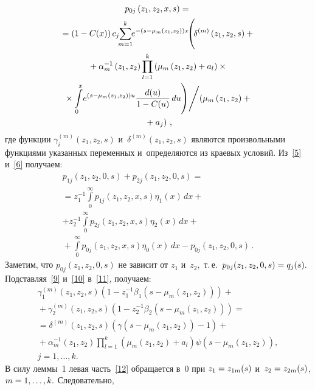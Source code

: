 \begin{multicols}{2}
\noindent
\begin{multline}
\label{10}
p_{0j}\left(z_1,z_2,x,s\right)={}\\
{}=\left(1-C(x)\right)
c_j\!\!\sum\limits_{m=1}^k\!\! e^{-(s-\mu_m(z_1,z_2))x}\!
\!\left(\!
\vphantom{\int\limits_{l=1}^k}
\delta^{(m)}\left(z_1,z_2,s\right)+{}\right.\\
{}+\alpha_m^{-1}\left(z_1,z_2\right)
\prod\limits_{l=1}^k
\left(\mu_m\left(z_1,z_2\right)+a_l\right)\times{}\\
\left.{}\times \int\limits_0^x\!
e^{(s-\mu_m(z_1,z_2))u}
\fr{d(u)}{1-C(u)}\,du
\right)
\!\Bigg/ \!\left(\mu_m\left(z_1,z_2\right)+{}\right.\\
\left.{}+a_j\right)\,,
\end{multline}
где функции $\gamma_i^{(m)}(z_1,z_2,s)$  и~$\delta^{(m)}(z_1,z_2,s)$ являются
произвольными функциями указанных переменных и~определяются из
краевых условий. Из~\eqref{5} и~\eqref{6} получаем:
\begin{multline}
\label{11}
p_{1j}\left(z_1,z_2,0,s\right)+p_{2j}\left(z_1,z_2,0,s\right)={}\\
{}=z_1^{-1}\int\limits_0^{\infty}p_{1j}\left(z_1,z_2,x,s\right)\eta_1(x)\,dx+{}
\\
+z_2^{-1}\int\limits_0^{\infty}p_{2j}\left(z_1,z_2,x,s\right)\eta_2(x)\,dx+{}\\
{}+
\int\limits_0^{\infty}p_{0j}\left(z_1,z_2,x,s\right)\eta_0(x)\,dx
-p_{0j}\left(z_1,z_2,0,s\right)\,.
\end{multline}
Заметим, что $p_{0j}(z_1,z_2,0,s)$ не зависит от $z_1$ и~$z_2,$ т.\,е.\
$p_{0j}(z_1,z_2,0,s)\hm=q_j(s).$ 
Подставляя~\eqref{9} и~\eqref{10} в~\eqref{11}, получаем:
\begin{multline}
\label{12}
\gamma_1^{(m)}\left(z_1,z_2,s\right)\left(1-z_1^{-1}\beta_1(s-\mu_m(z_1,z_2))\right)+{}\\
{}+
\gamma_2^{(m)}(z_1,z_2,s)\left(1-z_2^{-1}\beta_2(s-\mu_m(z_1,z_2))\right)={}\\
{} =
\delta^{(m)}\left(z_1,z_2,s\right)\left(\gamma\left(s-\mu_m\left(z_1,z_2\right)\right)-1\right)+{}\\
{}+
\alpha_m^{-1}\left(z_1,z_2\right)\prod\limits_{l=1}^k
\left(\mu_m\left(z_1,z_2\right)+a_l\right)\psi\left(s-\mu_m(z_1,z_2)\right),\\
j=1,\ldots,k.
\end{multline}
В силу леммы~1 левая часть~\eqref{12} обращается в~0 при
$z_1\hm=z_{1m}(s)$ и~$z_2\hm=z_{2m}(s)$, $m\hm=1,\ldots,k.$ Следовательно,
\begin{multline}

\end{multline}
\end{multicols}
